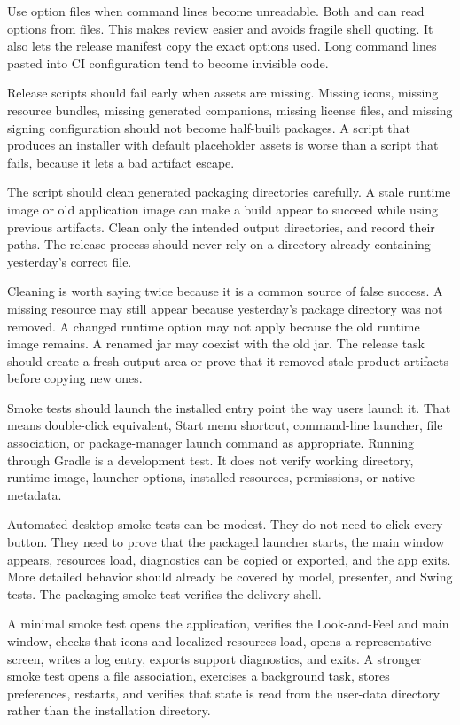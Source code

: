 Use option files when command lines become unreadable. Both  and  can read options from files. This makes review easier and avoids fragile shell quoting. It also lets the release manifest copy the exact options used. Long command lines pasted into CI configuration tend to become invisible code.

Release scripts should fail early when assets are missing. Missing icons, missing resource bundles, missing generated companions, missing license files, and missing signing configuration should not become half-built packages. A script that produces an installer with default placeholder assets is worse than a script that fails, because it lets a bad artifact escape.

The script should clean generated packaging directories carefully. A stale runtime image or old application image can make a build appear to succeed while using previous artifacts. Clean only the intended output directories, and record their paths. The release process should never rely on a directory already containing yesterday's correct file.

Cleaning is worth saying twice because it is a common source of false success. A missing resource may still appear because yesterday's package directory was not removed. A changed runtime option may not apply because the old runtime image remains. A renamed jar may coexist with the old jar. The release task should create a fresh output area or prove that it removed stale product artifacts before copying new ones.

Smoke tests should launch the installed entry point the way users launch it. That means double-click equivalent, Start menu shortcut, command-line launcher, file association, or package-manager launch command as appropriate. Running  through Gradle is a development test. It does not verify working directory, runtime image, launcher options, installed resources, permissions, or native metadata.

Automated desktop smoke tests can be modest. They do not need to click every button. They need to prove that the packaged launcher starts, the main window appears, resources load, diagnostics can be copied or exported, and the app exits. More detailed behavior should already be covered by model, presenter, and Swing tests. The packaging smoke test verifies the delivery shell.

A minimal smoke test opens the application, verifies the Look-and-Feel and main window, checks that icons and localized resources load, opens a representative screen, writes a log entry, exports support diagnostics, and exits. A stronger smoke test opens a file association, exercises a background task, stores preferences, restarts, and verifies that state is read from the user-data directory rather than the installation directory.


